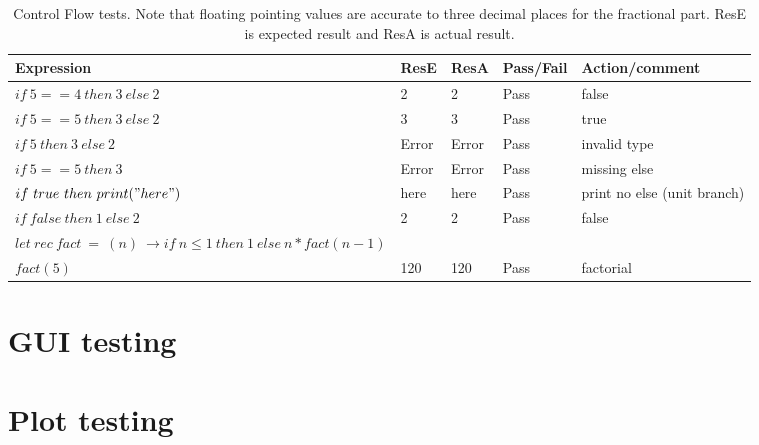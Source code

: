 \begin{table}[h]
    \caption{Control Flow tests. Note that floating pointing values are accurate to three decimal places for the fractional part. ResE is expected result and ResA is actual result. \\}
    \begin{tabular}{|p{1.8in}|p{0.5in}|p{0.4in}|p{0.6in}|p{1.4in}|} \hline
    Expression & ResE & ResA& Pass/Fail & Action/comment \\ \hline \hline
    $if\ 5 == 4\ then\ 3\ else\ 2$ & 2 & 2 & Pass & false \\ \hline
    $if\ 5 == 5\ then\ 3\ else\ 2$ & 3 & 3 & Pass & true \\ \hline
    $if\ 5\ then\ 3\ else\ 2$ & Error & Error & Pass & invalid type \\ \hline
    $if\ 5 == 5\ then\ 3$ & Error & Error & Pass & missing else \\ \hline
    $if\ true\ then\ print("here")$ & here & here & Pass & print no else (unit branch) \\ \hline
    $if\ false\ then\ 1\ else\ 2$ & 2 & 2 & Pass & false \\ \hline
    $let\ rec\ fact\ =\ (n)\ \rightarrow if\ n \leq 1\ then\ 1\ else\ n * fact(n-1)$ & & & & \\ \hline
    $fact(5)$ & 120 & 120 & Pass & factorial \\ \hline
    \end{tabular}
    \label{tab:control}
\end{table}

\section{GUI testing}\label{sec:gui-testing}

\section{Plot testing}\label{sec:plot-testing}